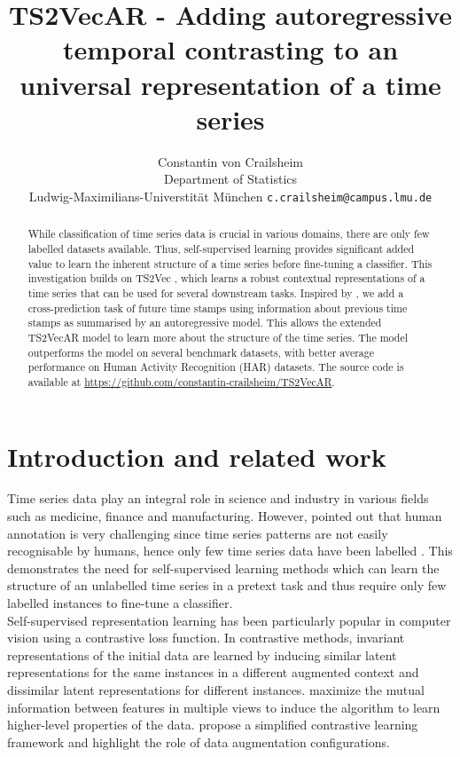 \documentclass{article}
\title{TS2VecAR - Adding autoregressive temporal contrasting to an universal representation of a time series}
\author{%
  Constantin von Crailsheim \\
Department of Statistics\\
  Ludwig-Maximilians-Universtität München
  \texttt{c.crailsheim@campus.lmu.de} \\
}
\begin{document}
\maketitle


\begin{abstract}
While classification of time series data is crucial in various domains, there are only few labelled datasets available. Thus, self-supervised learning provides significant added value to learn the inherent structure of a time series before fine-tuning a classifier. This investigation builds on TS2Vec \citep{ts2vec}, which learns a robust contextual representations of a time series that can be used for several downstream tasks. Inspired by \citet{tstcc}, we add a cross-prediction task of future time stamps using information about previous time stamps as summarised by an autoregressive model. This allows the extended TS2VecAR model to learn more about the structure of the time series. The model outperforms the model on several benchmark datasets, with better average performance on Human Activity Recognition (HAR) datasets. The source code is available at \url{https://github.com/constantin-crailsheim/TS2VecAR}.
\end{abstract}


\section{Introduction and related work}

Time series data play an integral role in science and industry in various fields such as medicine, finance and manufacturing. However, \citet{tstcc} pointed out that human annotation is very challenging since time series patterns are not easily recognisable by humans, hence only few time series data have been labelled \citep{ching2020}. This demonstrates the need for self-supervised learning methods which can learn the structure of an unlabelled time series in a pretext task and thus require only few labelled instances to fine-tune a classifier. \\

Self-supervised representation learning has been particularly popular in computer vision using a contrastive loss function. In contrastive methods, invariant representations of the initial data are learned by inducing similar latent representations for the same instances in a different augmented context and dissimilar latent representations for different instances. \citet{bachman2019} maximize the mutual information between features in multiple views to induce the algorithm to learn higher-level properties of the data. \citet{simclr} propose a simplified contrastive learning framework and highlight the role of data augmentation configurations. \\
\end{document}
